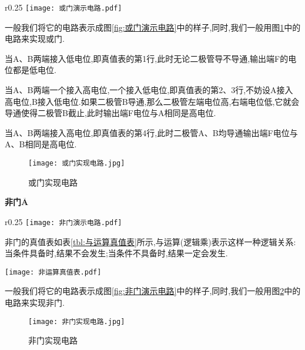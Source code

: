    \begin{wrapfigure}[6]{r}{0.25\textwidth}
        \centering
        \texttt{[image: 或门演示电路.pdf]}
        \caption{或门演示电路}
        \label{fig:或门演示电路}
    \end{wrapfigure}
    \Par 一般我们将它的电路表示成图\ref{fig:或门演示电路}中的样子,同时,我们一般用图\ref{fig:或门实现电路}中的电路来实现或门.
    
    \Par 当A、B两端接入低电位,即真值表的第1行,此时无论二极管导不导通,输出端F的电位都是低电位.
    
    \Par 当A、B两端一个接入高电位,一个接入低电位,即真值表的第2、3行,不妨设A接入高电位,B接入低电位.如果二极管B导通,那么二极管左端电位高,右端电位低,它就会导通使得二极管B截止,此时输出端F电位与A相同是高电位.
    
    \Par 当A、B两端接入高电位,即真值表的第4行,此时二极管A、B均导通输出端F电位与A、B相同是高电位.
    \begin{figure}[htbp]
        \centering
        \texttt{[image: 或门实现电路.jpg]}
        \caption{或门实现电路}
        \label{fig:或门实现电路}
    \end{figure}


    \textbf{非门}$\overline{\boldsymbol{A}}$

    \begin{wrapfigure}{r}{0.25\textwidth}
        \centering
        \texttt{[image: 非门演示电路.pdf]}
        \caption{非门演示电路}
        \label{fig:非门演示电路}
    \end{wrapfigure}
    \Par 非门的真值表如表\ref{tbl:与运算真值表}所示,与运算(逻辑乘)表示这样一种逻辑关系:当条件具备时,结果不会发生;当条件不具备时,结果一定会发生.

    \begin{table}[htbp]
        \centering
        \caption{非运算真值表}
        \texttt{[image: 非运算真值表.pdf]}
        \label{tbl:非运算真值表}
    \end{table}
    
    
    \Par 一般我们将它的电路表示成图\ref{fig:非门演示电路}中的样子,同时,我们一般用图\ref{fig:非门实现电路}中的电路来实现非门.
    
    \begin{figure}[htbp]
        \centering
        \texttt{[image: 非门实现电路.jpg]}
        \caption{非门实现电路}
        \label{fig:非门实现电路}
    \end{figure}

